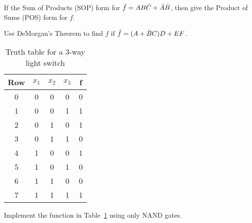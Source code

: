 

\begin{prob}[10 marks]
If the Sum of Products (SOP) form for $ \bar{f} = AB\bar{C}+\bar{A}\bar{B}$, then give the Product of Sums (POS) form for
$f$. 
\end{prob}

\begin{prob}[10 marks]
Use DeMorgan's Theorem to find $f$  if  $\bar{f} = (A + \bar{B} C)D + EF$. 
\end{prob}



\begin{table}
  \centering
  \begin{tabular}{c|ccc||c}
    \toprule
    Row & $x_1$ & $x_2$ & $x_3$ & f \\
    \midrule
    0 & 0 & 0 & 0 & 0 \\
    1 & 0 & 0 & 1 & 1 \\
    2 & 0 & 1 & 0 & 1 \\
    3 & 0 & 1 & 1 & 0 \\
    4 & 1 & 0 & 0 & 1 \\
    5 & 1 & 0 & 1 & 0 \\
    6 & 1 & 1 & 0 & 0 \\
    7 & 1 & 1 & 1 & 1 \\
    \bottomrule
    \end{tabular}
    \caption{Truth table for a 3-way light switch}
    \label{tab:3-way-light-switch}
\end{table}

\begin{example}
 Implement the function in Table~\ref{tab:3-way-light-switch} using only NAND
 gates. 
\end{example}

